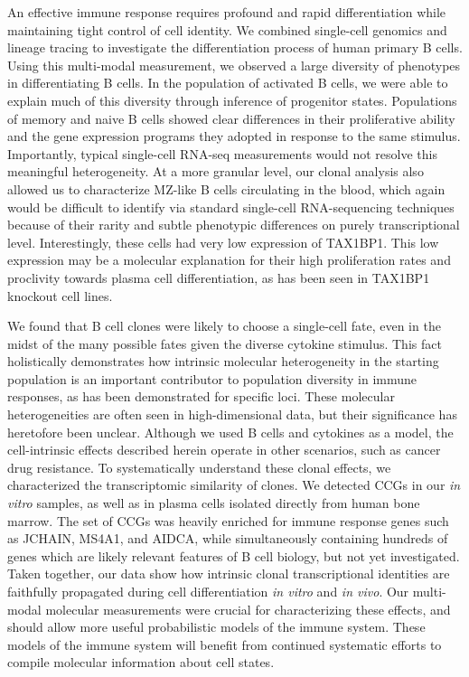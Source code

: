An effective immune response requires profound and rapid differentiation while maintaining tight control of cell identity. We combined single-cell genomics and lineage tracing to investigate the differentiation process of human primary B cells. Using this multi-modal measurement, we observed a large diversity of phenotypes in differentiating B cells. In the population of activated B cells, we were able to explain much of this diversity through inference of progenitor states. Populations of memory and naive B cells showed clear differences in their proliferative ability and the gene expression programs they adopted in response to the same stimulus. Importantly, typical single-cell RNA-seq measurements would not resolve this meaningful heterogeneity. At a more granular level, our clonal analysis also allowed us to characterize MZ-like B cells circulating in the blood, which again would be difficult to identify via standard single-cell RNA-sequencing techniques because of their rarity and subtle phenotypic differences on purely transcriptional level. Interestingly, these cells had very low expression of TAX1BP1. This low expression may be a molecular explanation for their high proliferation rates and proclivity towards plasma cell differentiation, as has been seen in TAX1BP1 knockout cell lines\cite{matsushita_regulation_2016}.

We found that B cell clones were likely to choose a single-cell fate, even in the midst of the many possible fates given the diverse cytokine stimulus. This fact holistically demonstrates how intrinsic molecular heterogeneity in the starting population is an important contributor to population diversity in immune responses, as has been demonstrated for specific loci\cite{wu_intrinsic_2017}. These molecular heterogeneities are often seen in high-dimensional data, but their significance has heretofore been unclear. Although we used B cells and cytokines as a model, the cell-intrinsic effects described herein operate in other scenarios, such as cancer drug resistance\cite{goyal_pre-determined_2021}. To systematically understand these clonal effects, we characterized the transcriptomic similarity of clones. We detected CCGs in our \textit{in vitro} samples, as well as in plasma cells isolated directly from human bone marrow. The set of CCGs was heavily enriched for immune response genes such as JCHAIN, MS4A1, and AIDCA, while simultaneously containing hundreds of genes which are likely relevant features of B cell biology, but not yet investigated. Taken together, our data show how intrinsic clonal transcriptional identities are faithfully propagated during cell differentiation \textit{in vitro} and \textit{in vivo}. Our multi-modal molecular measurements were crucial for characterizing these effects, and should allow more useful probabilistic models of the immune system\cite{hodgkin_modifying_2018}. These models of the immune system will benefit from continued systematic efforts to compile molecular information about cell states\cite{tabula_sapiens_consortium_tabula_2022}.


